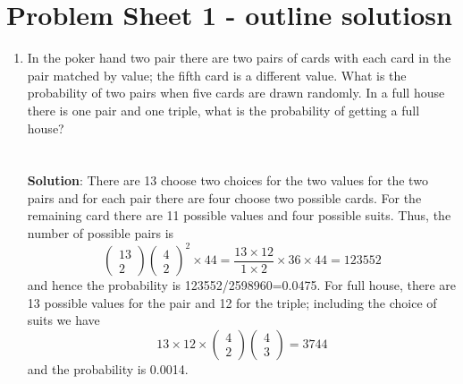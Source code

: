 \documentclass[11pt,a4paper]{scrartcl}
\begin{document}
\section*{Problem Sheet 1 - outline solutiosn}



\begin{enumerate}



\item In the poker hand two pair there are two pairs of cards with
  each card in the pair matched by value; the fifth card is a
  different value. What is the probability of two pairs when five
  cards are drawn randomly. In a full house there is one pair and one
  triple, what is the probability of getting a full
  house?\\ \\ \\ \textbf{Solution}: There are 13 choose two choices
  for the two values for the two pairs and for each pair there are
  four choose two possible cards. For the remaining card there are 11
  possible values and four possible suits. Thus, the number of
  possible pairs is
\begin{equation}
\left(\begin{array}{c}13\\2\end{array}\right)\left(\begin{array}{c}4\\2\end{array}\right)^2\times 44
=
\frac{13\times 12}{1\times 2}\times 36\times 44=123552
\end{equation}
and hence the probability is 123552/2598960=0.0475. For full house,
there are 13 possible values for the pair and 12 for the triple; including the choice of suits we have
\begin{equation}
13\times 12 \times \left(\begin{array}{c}4\\2\end{array}\right)\left(\begin{array}{c}4\\3\end{array}\right)=3744
\end{equation}
and the probability is 0.0014.


\end{enumerate}
\end{document}

